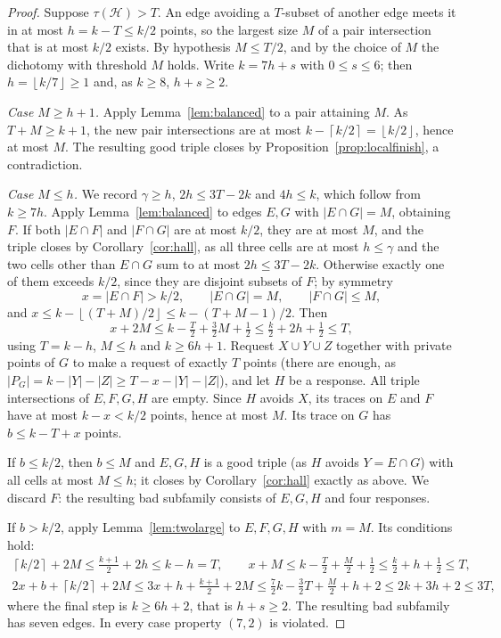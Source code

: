 \documentclass[11pt]{article}
\numberwithin{equation}{section}
\theoremstyle{definition}
\theoremstyle{remark}
\newcommand{\HH}{\mathcal H}
\newcommand{\ceil}[1]{\left\lceil #1\right\rceil}
\newcommand{\floor}[1]{\left\lfloor #1\right\rfloor}
\begin{document}
\begin{proof}
Suppose $\tau(\HH)>T$. An edge avoiding a $T$-subset of another edge
meets it in at most $h=k-T\le k/2$ points, so the largest size $M$ of a
pair intersection that is at most $k/2$ exists. By hypothesis
$M\le T/2$, and by the choice of $M$ the dichotomy with threshold $M$
holds. Write $k=7h+s$ with $0\le s\le6$; then $h=\floor{k/7}\ge1$ and,
as $k\ge8$, $h+s\ge2$.

\emph{Case $M\ge h+1$.} Apply Lemma~\ref{lem:balanced} to a pair
attaining $M$. As $T+M\ge k+1$, the new pair intersections are at most
$k-\ceil{k/2}=\floor{k/2}$, hence at most $M$. The resulting good
triple closes by Proposition~\ref{prop:localfinish}, a contradiction.

\emph{Case $M\le h$.} We record $\gamma\ge h$, $2h\le3T-2k$ and $4h\le k$,
which follow from $k\ge7h$. Apply Lemma~\ref{lem:balanced} to edges
$E,G$ with $|E\cap G|=M$, obtaining $F$. If both $|E\cap F|$ and
$|F\cap G|$ are at most $k/2$, they are at most $M$, and the triple
closes by Corollary~\ref{cor:hall}, as all three cells are at most
$h\le\gamma$ and the two cells other than $E\cap G$ sum to at most
$2h\le3T-2k$. Otherwise exactly one of them exceeds $k/2$, since they
are disjoint subsets of $F$; by symmetry
\[
 x=|E\cap F|>k/2,\qquad |E\cap G|=M,\qquad |F\cap G|\le M,
\]
and $x\le k-\floor{(T+M)/2}\le k-(T+M-1)/2$. Then
\[
 x+2M\le k-\tfrac T2+\tfrac32M+\tfrac12\le\tfrac k2+2h+\tfrac12\le T,
\]
using $T=k-h$, $M\le h$ and $k\ge6h+1$. Request $X\cup Y\cup Z$ together
with private points of $G$ to make a request of exactly $T$ points (there
are enough, as $|P_G|=k-|Y|-|Z|\ge T-x-|Y|-|Z|$), and let $H$ be a
response. All triple intersections of $E,F,G,H$ are empty. Since $H$
avoids $X$, its traces on $E$ and $F$ have at most $k-x<k/2$ points,
hence at most $M$. Its trace on $G$ has $b\le k-T+x$ points.

If $b\le k/2$, then $b\le M$ and $E,G,H$ is a good triple (as $H$ avoids
$Y=E\cap G$) with all cells at most $M\le h$; it closes by
Corollary~\ref{cor:hall} exactly as above. We discard $F$: the resulting
bad subfamily consists of $E,G,H$ and four responses.

If $b>k/2$, apply Lemma~\ref{lem:twolarge} to $E,F,G,H$ with $m=M$. Its
conditions hold:
\begin{gather*}
 \ceil{k/2}+2M\le\tfrac{k+1}2+2h\le k-h=T,\qquad
 x+M\le k-\tfrac T2+\tfrac M2+\tfrac12\le\tfrac k2+h+\tfrac12\le T,\\
 2x+b+\ceil{k/2}+2M\le3x+h+\tfrac{k+1}2+2M
 \le\tfrac72k-\tfrac32T+\tfrac M2+h+2\le2k+3h+2\le3T,
\end{gather*}
where the final step is $k\ge6h+2$, that is $h+s\ge2$. The resulting bad
subfamily has seven edges. In every case property $(7,2)$ is violated.
\end{proof}
\end{document}
